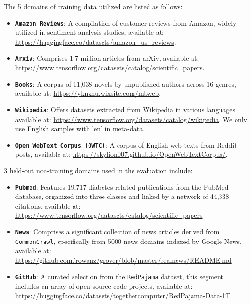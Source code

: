 \documentclass{article} %
\begin{document}
\begin{appendices}{}
The 5 domains of training data utilized are listed as follows:

\begin{itemize}
\item \textbf{\texttt{Amazon Reviews}}: A compilation of customer reviews from Amazon, widely utilized in sentiment analysis studies, available at: \url{https://huggingface.co/datasets/amazon_us_reviews}.
\item \textbf{\texttt{Arxiv}}: Comprises 1.7 million articles from arXiv, available at: \url{https://www.tensorflow.org/datasets/catalog/scientific_papers}.
\item \textbf{\texttt{Books}}: A corpus of 11,038 novels by unpublished authors across 16 genres, available at: \url{https://yknzhu.wixsite.com/mbweb}.
\item \textbf{\texttt{Wikipedia}}: Offers datasets extracted from Wikipedia in various languages, available at: \url{https://www.tensorflow.org/datasets/catalog/wikipedia}. We only use English samples with 'en' in meta-data.
\item \textbf{\texttt{Open WebText Corpus (OWTC)}}: A corpus of English web texts from Reddit posts, available at: \url{https://skylion007.github.io/OpenWebTextCorpus/}.
\end{itemize}

3 held-out non-training domains used in the evaluation include:
\begin{itemize}
    \item \textbf{\texttt{Pubmed}}: Features 19,717 diabetes-related publications from the PubMed database, organized into three classes and linked by a network of 44,338 citations, available at: \url{https://www.tensorflow.org/datasets/catalog/scientific_papers}
    \item \textbf{\texttt{News}}: Comprises a significant collection of news articles derived from \texttt{CommonCrawl}, specifically from 5000 news domains indexed by Google News, available at: \url{https://github.com/rowanz/grover/blob/master/realnews/README.md}
    \item \textbf{\texttt{GitHub}}: A curated selection from the \texttt{RedPajama} dataset, this segment includes an array of open-source code projects, available at: \url{https://huggingface.co/datasets/togethercomputer/RedPajama-Data-1T}
\end{itemize}





\end{appendices}
\end{document}
